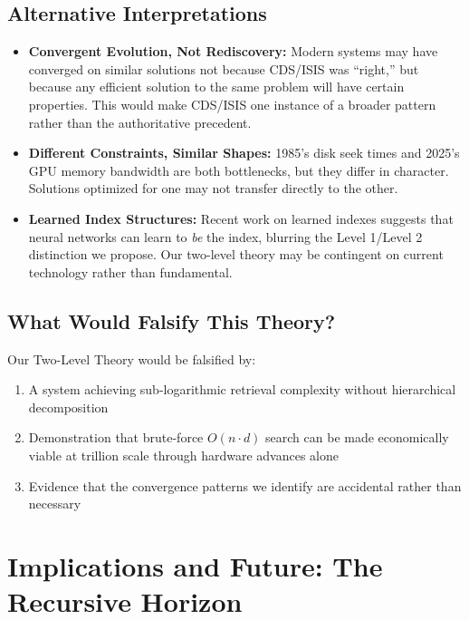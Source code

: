 \documentclass[manuscript,screen,nonacm]{acmart}
\begin{document}
\subsection{Alternative Interpretations}

\begin{itemize}
    \item \textbf{Convergent Evolution, Not Rediscovery:} Modern systems may have converged on similar solutions not because CDS/ISIS was ``right,'' but because any efficient solution to the same problem will have certain properties. This would make CDS/ISIS one instance of a broader pattern rather than the authoritative precedent.

    \item \textbf{Different Constraints, Similar Shapes:} 1985's disk seek times and 2025's GPU memory bandwidth are both bottlenecks, but they differ in character. Solutions optimized for one may not transfer directly to the other.

    \item \textbf{Learned Index Structures:} Recent work on learned indexes \cite{kraska2018} suggests that neural networks can learn to \textit{be} the index, blurring the Level 1/Level 2 distinction we propose. Our two-level theory may be contingent on current technology rather than fundamental.
\end{itemize}

\subsection{What Would Falsify This Theory?}

Our Two-Level Theory would be falsified by:
\begin{enumerate}
    \item A system achieving sub-logarithmic retrieval complexity without hierarchical decomposition
    \item Demonstration that brute-force $O(n \cdot d)$ search can be made economically viable at trillion scale through hardware advances alone
    \item Evidence that the convergence patterns we identify are accidental rather than necessary
\end{enumerate}

\section{Implications and Future: The Recursive Horizon}
\end{document}
